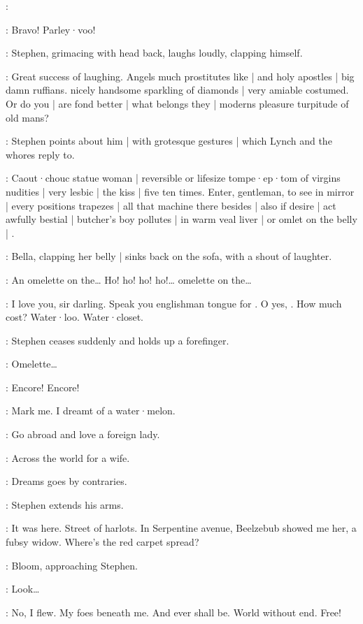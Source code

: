 \Lynch:

\Whores:
Bravo!
Parley·voo!

:
Stephen,
grimacing with head back,
laughs loudly,
clapping himself.

\Stephen:
Great success of laughing.
Angels much prostitutes like |
and holy apostles |
big damn ruffians.
 nicely handsome sparkling of diamonds |
very amiable costumed.
Or do you |
are fond better |
what belongs they |
moderns pleasure turpitude of old mans?

:
Stephen points about him |
with grotesque gestures |
which Lynch and the whores reply to.

\Stephen:
Caout·chouc statue woman |
reversible or lifesize tompe·ep·tom of virgins nudities |
very lesbic |
the kiss |
five ten times.
Enter,
gentleman,
to see in mirror |
every positions trapezes |
all that machine there besides |
also if desire |
act awfully bestial |
butcher's boy pollutes |
in warm veal liver |
or omlet on the belly |
.

:
Bella,
clapping her belly |
sinks back on the sofa,
with a shout of laughter.

\Bella:
An omelette on the…
Ho! ho! ho! ho!…
omelette on the…

\Stephen:
I love you,
sir darling.
Speak you englishman tongue for .
O yes,
.
How much cost?
Water·loo.
Water·closet.

:
Stephen ceases suddenly and holds up a forefinger.

\Bella:
Omelette…

\Whores:
Encore! Encore!

\Stephen:
Mark me.
I dreamt of a water·melon.

\Zoe:
Go abroad and love a foreign lady.

\Lynch:
Across the world for a wife.

\Florry:
Dreams goes by contraries.

:
Stephen extends his arms.

\Stephen:
It was here.
Street of harlots.
In Serpentine avenue,
Beelzebub showed me her,
a fubsy widow.
Where's the red carpet spread?

:
Bloom,
approaching Stephen.

\Bloom:
Look…

\Stephen:
No,
I flew.
My foes beneath me.
And ever shall be.
World without end.
Free!

